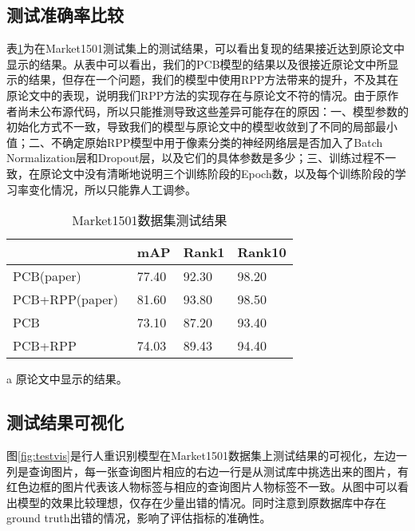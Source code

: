 \subsection{测试准确率比较}

表\ref{tab:test}为在Market1501测试集上的测试结果，可以看出复现的结果接近达到原论文\cite{sun2017beyond}中显示的结果。从表中可以看出，我们的PCB模型的结果以及很接近原论文中所显示的结果，但存在一个问题，我们的模型中使用RPP方法带来的提升，不及其在原论文中的表现，说明我们RPP方法的实现存在与原论文不符的情况。由于原作者尚未公布源代码，所以只能推测导致这些差异可能存在的原因：一、模型参数的初始化方式不一致，导致我们的模型与原论文中的模型收敛到了不同的局部最小值；二、不确定原始RPP模型中用于像素分类的神经网络层是否加入了Batch Normalization\cite{ioffe2015batch}层和Dropout\cite{srivastava2014dropout}层，以及它们的具体参数是多少；三、训练过程不一致，在原论文中没有清晰地说明三个训练阶段的Epoch数，以及每个训练阶段的学习率变化情况，所以只能靠人工调参。

\begin{table}[!ht]
    \centering
    \caption{Market1501数据集测试结果}
    \label{tab:test}
    \begin{threeparttable}
    \begin{tabularx}{\textwidth}{XXXX}
    \toprule
                            & mAP   & Rank1 & Rank10 \\ \midrule
    PCB(paper)~\tnote{a}    & 77.40  & 92.30  & 98.20   \\
    PCB+RPP(paper)~\tnote{a}& 81.60  & 93.80  & 98.50   \\
    PCB                     & 73.10  & 87.20  & 93.40   \\
    PCB+RPP                 & 74.03  & 89.43  & 94.40   \\ \bottomrule
    \end{tabularx}
    \begin{tablenotes}
        \footnotesize
        \item[a] 原论文\cite{sun2017beyond}中显示的结果。
    \end{tablenotes}
    \end{threeparttable}

\end{table}

\subsection{测试结果可视化}

图\ref{fig:testvis}是行人重识别模型在Market1501数据集上测试结果的可视化，左边一列是查询图片，每一张查询图片相应的右边一行是从测试库中挑选出来的图片，有红色边框的图片代表该人物标签与相应的查询图片人物标签不一致。从图中可以看出模型的效果比较理想，仅存在少量出错的情况。同时注意到原数据库\cite{zheng2015scalable}中存在ground truth出错的情况，影响了评估指标的准确性。

